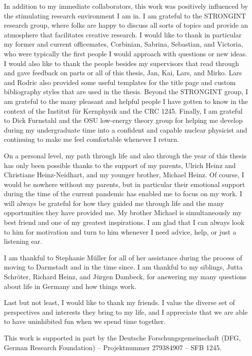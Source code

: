 In addition to my immediate collaborators,
this work was positively influenced by the stimulating research environment
I am in.
I am grateful to the STRONGINT research group,
where folks are happy to discuss all sorts of topics
and provide an atmosphere that facilitates creative research.
I would like to thank in particular my former and current officemates,
Corbinian, Sabrina, Sebastian, and Victoria,
who were typically the first people I would approach with questions or new ideas.
I would also like to thank the people besides my supervisors
that read through and gave feedback on
parts or all of this thesis,
Jan, Kai, Lars, and Mirko.
Lars and Rodric also provided some useful templates
for the title page and custom bibliography styles
that are used in the thesis.
Beyond the STRONGINT group,
I am grateful to the many pleasant and helpful people
I have gotten to know in the context of the Institut f\"{u}r Kernphysik
and the CRC 1245.
Finally, I am grateful to
Dick Furnstahl and
the OSU low-energy theory group
for helping me develop during my undergraduate time
into a confident and capable nuclear physicist
and continuing to make me feel comfortable whenever I return.

On a personal level,
my path through life and also through the year of this thesis
has only been possible thanks to the support of my parents,
Ulrich Heinz and Christiane Heinz-Neidhart,
and my younger brother,
Michael Heinz.
Of course,
I would be nowhere without my parents,
but in particular their emotional support
during the time of the current pandemic
has enabled me to focus on my work.
I will always be grateful for
how they guided me through life
and the many opportunities they have provided me.
My brother Michael is simultaneously my best friend
and one of my greatest inspirations.
I am glad that I can always look to him for motivation
and turn to him whenever I need advice, help, or just a listening ear.

I am thankful to Stephanie M\"{u}ller
for all of her assistance during the process of moving to Darmstadt
and in the time since.
I am thankful to my siblings,
Jutta Schr\"{o}ter, Richard Heinz, and J\"{u}rgen Dambeck,
for answering my many questions about life in Germany
and how things work.

Last but not least,
I would like to thank my friends.
I value the diverse set of perspectives and interests
they bring to my life,
and I appreciate that we are able to have uninhibited fun
when we spend time together.

This work is supported in part by the Deutsche Forschungsgemeinschaft
(DFG, German Research Foundation) – Projektnummer 279384907 – SFB 1245.
